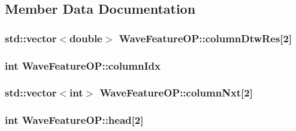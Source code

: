 \subsection{Member Data Documentation}
\hypertarget{class_wave_feature_o_p_a8341cc94705d4f96a53e61b397e26641}{
\subsubsection[{column\+Dtw\+Res}]{\setlength{\rightskip}{0pt plus 5cm}std\+::vector$<$double$>$ Wave\+Feature\+O\+P\+::column\+Dtw\+Res\mbox{[}2\mbox{]}\hspace{0.3cm}{\ttfamily [private]}}}\label{class_wave_feature_o_p_a8341cc94705d4f96a53e61b397e26641}
\hypertarget{class_wave_feature_o_p_a506bd025079326383412704dd93c402d}{
\subsubsection[{column\+Idx}]{\setlength{\rightskip}{0pt plus 5cm}int Wave\+Feature\+O\+P\+::column\+Idx\hspace{0.3cm}{\ttfamily [private]}}}\label{class_wave_feature_o_p_a506bd025079326383412704dd93c402d}
\hypertarget{class_wave_feature_o_p_ad14d7d2758bef1c990adda645f1a1d34}{
\subsubsection[{column\+Nxt}]{\setlength{\rightskip}{0pt plus 5cm}std\+::vector$<$int$>$ Wave\+Feature\+O\+P\+::column\+Nxt\mbox{[}2\mbox{]}\hspace{0.3cm}{\ttfamily [private]}}}\label{class_wave_feature_o_p_ad14d7d2758bef1c990adda645f1a1d34}
\hypertarget{class_wave_feature_o_p_ad46053ff42554d848423b0caabeea87f}{
\subsubsection[{head}]{\setlength{\rightskip}{0pt plus 5cm}int Wave\+Feature\+O\+P\+::head\mbox{[}2\mbox{]}\hspace{0.3cm}{\ttfamily [private]}}}\label{class_wave_feature_o_p_ad46053ff42554d848423b0caabeea87f}
